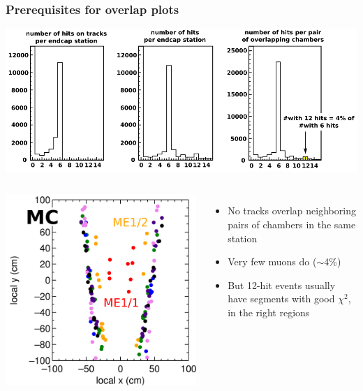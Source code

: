 \documentclass[compress]{beamer}
\begin{document}
\begin{frame}
\frametitle{Prerequisites for overlap plots}

\vspace{-0.2 cm}
\begin{center}
\includegraphics[width=0.85\linewidth]{num_hits.png}
\end{center}

\vspace{-0.2 cm}
\begin{columns}
\includegraphics[width=\linewidth]{overlap_positions.png}
\begin{itemize}
\item No tracks overlap neighboring pairs of chambers in the same station
\item Very few muons do ($\sim$4\%)
\item But 12-hit events usually have segments with good $\chi^2$, in the right regions
\end{itemize}
\end{columns}
\end{frame}
\end{document}
